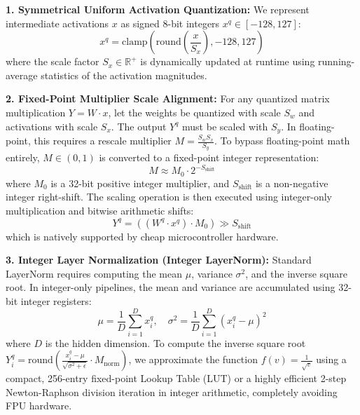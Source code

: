 \textbf{1. Symmetrical Uniform Activation Quantization:}
We represent intermediate activations $x$ as signed 8-bit integers $x^q \in [-128, 127]$:
\begin{equation}
x^q = \text{clamp}\left( \text{round}\left( \frac{x}{S_x} \right), -128, 127 \right)
\end{equation}
where the scale factor $S_x \in \mathbb{R}^+$ is dynamically updated at runtime using running-average statistics of the activation magnitudes.

\textbf{2. Fixed-Point Multiplier Scale Alignment:}
For any quantized matrix multiplication $Y = W \cdot x$, let the weights be quantized with scale $S_w$ and activations with scale $S_x$. The output $Y^q$ must be scaled with $S_y$. In floating-point, this requires a rescale multiplier $M = \frac{S_w S_x}{S_y}$. To bypass floating-point math entirely, $M \in (0, 1)$ is converted to a fixed-point integer representation:
\begin{equation}
M \approx M_0 \cdot 2^{-S_{\text{shift}}}
\end{equation}
where $M_0$ is a 32-bit positive integer multiplier, and $S_{\text{shift}}$ is a non-negative integer right-shift. The scaling operation is then executed using integer-only multiplication and bitwise arithmetic shifts:
\begin{equation}
Y^q = \left( (W^q \cdot x^q) \cdot M_0 \right) \gg S_{\text{shift}}
\end{equation}
which is natively supported by cheap microcontroller hardware.

\textbf{3. Integer Layer Normalization (Integer LayerNorm):}
Standard LayerNorm requires computing the mean $\mu$, variance $\sigma^2$, and the inverse square root. In integer-only pipelines, the mean and variance are accumulated using 32-bit integer registers:
\begin{equation}
\mu = \frac{1}{D} \sum_{i=1}^D x^q_i, \quad \sigma^2 = \frac{1}{D} \sum_{i=1}^D (x^q_i - \mu)^2
\end{equation}
where $D$ is the hidden dimension. To compute the inverse square root $Y^q_i = \text{round}\left( \frac{x^q_i - \mu}{\sqrt{\sigma^2 + \epsilon}} \cdot M_{\text{norm}} \right)$, we approximate the function $f(v) = \frac{1}{\sqrt{v}}$ using a compact, 256-entry fixed-point Lookup Table (LUT) or a highly efficient 2-step Newton-Raphson division iteration in integer arithmetic, completely avoiding FPU hardware.

